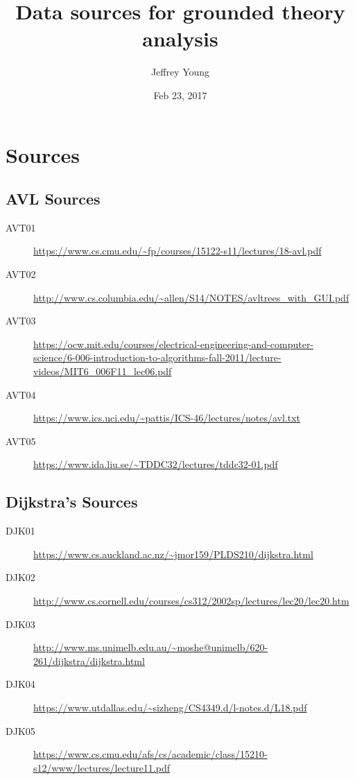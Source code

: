\documentclass[10pt, letterpaper]{article}
\author{Jeffrey Young}
\date{Feb 23, 2017}
\title{Data sources for grounded theory analysis}
\begin{document}
\maketitle

\section*{Sources}
\label{sec:org374574d}

\subsection*{AVL Sources}
\label{sec:orgdedb6dc}
\begin{description}
\item[{AVT01}] \url{https://www.cs.cmu.edu/\~fp/courses/15122-s11/lectures/18-avl.pdf}
\item[{AVT02}] \url{http://www.cs.columbia.edu/\~allen/S14/NOTES/avltrees\_with\_GUI.pdf}
\item[{AVT03}] \url{https://ocw.mit.edu/courses/electrical-engineering-and-computer-science/6-006-introduction-to-algorithms-fall-2011/lecture-videos/MIT6\_006F11\_lec06.pdf}
\item[{AVT04}] \url{https://www.ics.uci.edu/\~pattis/ICS-46/lectures/notes/avl.txt}
\item[{AVT05}] \url{https://www.ida.liu.se/\~TDDC32/lectures/tddc32-01.pdf}
\end{description}

\subsection*{Dijkstra's Sources}
\label{sec:org0a13d41}
\begin{description}
\item[{DJK01}] \url{https://www.cs.auckland.ac.nz/\~jmor159/PLDS210/dijkstra.html}
\item[{DJK02}] \url{http://www.cs.cornell.edu/courses/cs312/2002sp/lectures/lec20/lec20.htm}
\item[{DJK03}] \url{http://www.ms.unimelb.edu.au/\~moshe@unimelb/620-261/dijkstra/dijkstra.html}
\item[{DJK04}] \url{https://www.utdallas.edu/\~sizheng/CS4349.d/l-notes.d/L18.pdf}
\item[{DJK05}] \url{https://www.cs.cmu.edu/afs/cs/academic/class/15210-s12/www/lectures/lecture11.pdf}
\end{description}
\end{document}

